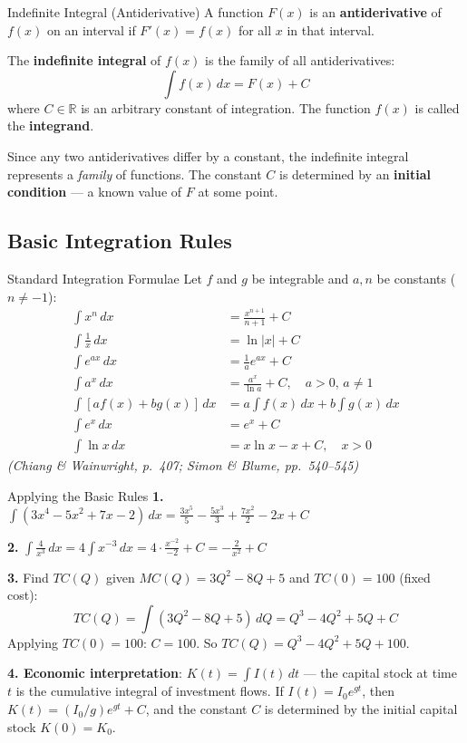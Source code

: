 \documentclass[12pt, a4paper]{article}
\theoremstyle{definition}
\newcommand{\R}{\mathbb{R}}
\newcommand{\dd}[1]{\,d#1}
\begin{document}
\begin{defbox}{Indefinite Integral (Antiderivative)}
A function $F(x)$ is an \textbf{antiderivative} of $f(x)$ on an interval if
$F'(x) = f(x)$ for all $x$ in that interval.

The \textbf{indefinite integral} of $f(x)$ is the family of all
antiderivatives:
\[
  \int f(x)\dd{x} = F(x) + C
\]
where $C \in \R$ is an arbitrary constant of integration.
The function $f(x)$ is called the \textbf{integrand}.
\end{defbox}

Since any two antiderivatives differ by a constant, the indefinite integral
represents a \emph{family} of functions. The constant $C$ is determined by an
\textbf{initial condition} --- a known value of $F$ at some point.
\newpage
\subsection{Basic Integration Rules}

\begin{thmbox}{Standard Integration Formulae}
Let $f$ and $g$ be integrable and $a, n$ be constants ($n \neq -1$):
\begin{align}
  \int x^n \dd{x} &= \frac{x^{n+1}}{n+1} + C \tag{Power Rule} \\[4pt]
  \int \frac{1}{x}\dd{x} &= \ln|x| + C \tag{Reciprocal} \\[4pt]
  \int e^{ax}\dd{x} &= \frac{1}{a}e^{ax} + C \tag{Exponential} \\[4pt]
  \int a^x\dd{x} &= \frac{a^x}{\ln a} + C,\quad a>0,\,a\neq 1 \tag{General Exp.} \\[4pt]
  \int [af(x) + bg(x)]\dd{x} &= a\!\int f(x)\dd{x} + b\!\int g(x)\dd{x} \tag{Linearity} \\[4pt]
  \int e^x\dd{x} &= e^x + C \tag{Natural Exp.} \\[4pt]
  \int \ln x\dd{x} &= x\ln x - x + C,\quad x>0 \tag{Natural Log}
\end{align}
\emph{(Chiang \& Wainwright, p.\ 407; Simon \& Blume, pp.\ 540--545)}
\end{thmbox}

\begin{exbox}{Applying the Basic Rules}
\textbf{1.} $\displaystyle\int (3x^4 - 5x^2 + 7x - 2)\dd{x}
= \frac{3x^5}{5} - \frac{5x^3}{3} + \frac{7x^2}{2} - 2x + C$

\textbf{2.} $\displaystyle\int \frac{4}{x^3}\dd{x}
= 4\int x^{-3}\dd{x} = 4\cdot\frac{x^{-2}}{-2} + C = -\frac{2}{x^2} + C$

\textbf{3.} Find $TC(Q)$ given $MC(Q) = 3Q^2 - 8Q + 5$ and $TC(0) = 100$ (fixed cost):
\[
  TC(Q) = \int (3Q^2 - 8Q + 5)\dd{Q} = Q^3 - 4Q^2 + 5Q + C
\]
Applying $TC(0) = 100$: $C = 100$. So $TC(Q) = Q^3 - 4Q^2 + 5Q + 100$.

\textbf{4. Economic interpretation}: $K(t) = \int I(t)\dd{t}$ --- the capital
stock at time $t$ is the cumulative integral of investment flows. If
$I(t) = I_0 e^{gt}$, then $K(t) = (I_0/g)e^{gt} + C$, and the constant $C$
is determined by the initial capital stock $K(0) = K_0$.
\end{exbox}
\end{document}
